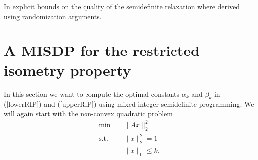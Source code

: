 \documentclass[a4paper,11pt,1p]{elsarticle}
\newcommand{\Norm}[2]{\lVert{#1}\rVert_{#2}}
\newcommand{\T}{^{\top}}
\begin{document}
In \cite{AspBG14} explicit bounds on the quality of the semidefinite relaxation where derived using randomization arguments.
 


\section{A MISDP for the restricted isometry property}
\label{sec:MISDP}

In this section we want to compute the optimal constants $\alpha_k$ and $\beta_k$ in (\ref{lowerRIP}) and (\ref{upperRIP}) using mixed integer semidefinite programming. We will again start with the non-convex quadratic problem
\begin{align}\label{QP2}
 \min \quad & \Norm{Ax}{2}^2 \nonumber \\
 \text{s.t.} \quad & \Norm{x}{2}^2 = 1 \tag{QP} \\
 & \Norm{x}{0} \leq k. \nonumber
\end{align}
\end{document}
